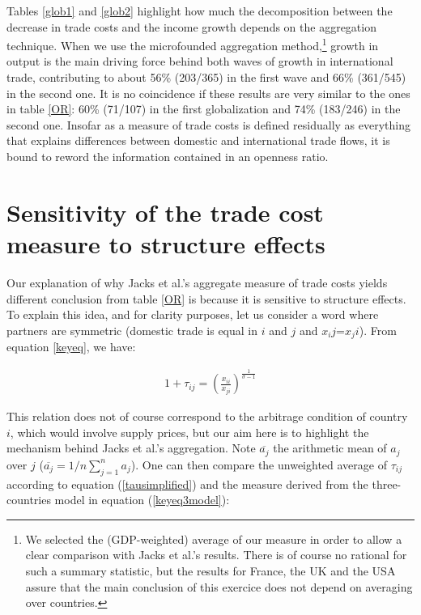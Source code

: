 \documentclass{article}
\begin{document}
Tables \ref{glob1} and \ref{glob2} highlight how much the decomposition
between the decrease in trade costs and the income growth depends on the aggregation technique. When we use the microfounded aggregation method,\footnote{We selected the (GDP-weighted) average of our measure in order
to allow a clear comparison with Jacks et al.'s results. There
is of course no rational for such a summary statistic, but the
results for France, the UK and the USA assure that the main
conclusion of this exercice does not depend on averaging over
countries.} 
growth in output is the main driving force behind both waves of growth in
international trade, contributing to about 56\% (203/365) in
the first wave and 66\% (361/545) in the second one. It is no coincidence
if these results are very similar to the ones in table \ref{OR}: 60\% (71/107) in the first globalization and 74\% (183/246) in the second one.
Insofar as a measure of
trade costs is defined residually as everything that explains
differences between domestic and international trade flows, it
is bound to reword the information contained in an openness
ratio.

\section{\label{3} Sensitivity of the trade cost measure to
structure effects}

Our explanation of why Jacks et al.'s aggregate measure of
trade costs yields different conclusion 
from table \ref{OR} is because it is sensitive to structure
effects. To explain this idea, and for clarity purposes, let us consider
a word where partners are symmetric (domestic trade is equal in $i$ and $j$ and $x_ij$=$x_ji$). From equation \ref{keyeq}, we have:

\begin{eqnarray}
1+\tau_{ij}= \left(\frac{x_{ii}}{x_{ji}}\right)^{\frac{1}{\sigma-1}}\label{tausimplified}
\end{eqnarray}

This relation does not of course correspond to the arbitrage
condition of country $i$, which would involve supply prices,
but our aim here is to highlight the mechanism behind Jacks et
al.'s aggregation. Note $\overline{a_j}$ the arithmetic mean
of $a_j$ over $j$ ($\overline{a_j}=1/n \sum_{j=1}^{n}a_j$). One can
then compare the unweighted average of $\tau_{ij}$ according to equation 
(\ref{tausimplified}) and the measure derived from the
three-countries model in equation (\ref{keyeq3model}):
\end{document}
